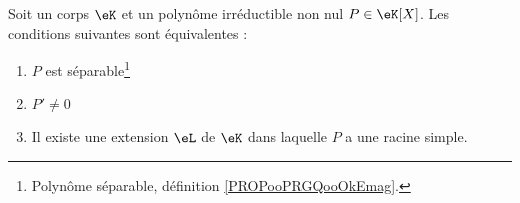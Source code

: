 \begin{proposition}         \label{PROPooMOZFooDGemBJ}
	Soit un corps \( \eK\) et un polynôme irréductible non nul \( P\in \eK[X]\). Les conditions suivantes sont équivalentes :
	\begin{enumerate}
		\item       \label{ITEMooDOTTooTZGhSq}
		      \( P\) est séparable\footnote{Polynôme séparable, définition \ref{PROPooPRGQooOkEmag}.}
		\item       \label{ITEMooRTDCooJGEtum}
		      \( P'\neq 0\)
		\item       \label{ITEMooZOMZooDPrNaC}
		      Il existe une extension \( \eL\) de \( \eK\) dans laquelle \( P\) a une racine simple.
	\end{enumerate}
\end{proposition}


